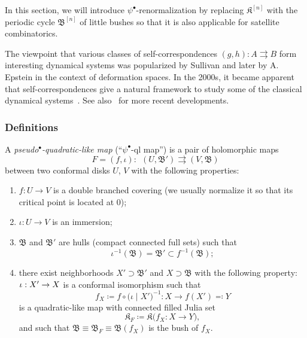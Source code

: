 \documentclass{amsart}
\newcommand{\bfilled}{{\boldsymbol{\mathfrak K} }}
\newcommand{\filled}{{\mathfrak K }}
\newcommand{\bush}{{\mathfrak B }}
\newcommand{\bbush}{{\boldsymbol {\mathfrak B} }}
\renewcommand{\sp}{{\ \ }}
\newcommand{\1}{{\mathbb 1 }}
\begin{document}
In this section, we will introduce $\psi^\bullet$-renormalization by replacing $\bfilled^{[n]}$ with the periodic cycle $\bbush^{[n]}$ of little bushes so that it is also applicable for satellite combinatorics. 

\begin{rem}
The viewpoint that various classes of self-correspondences ${(g,h)\colon A \rightrightarrows B}$ form interesting dynamical systems was popularized by Sullivan and later by A. Epstein in the context of deformation spaces. In the 2000s, it became apparent that self-correspondences give a natural framework to study some of the classical dynamical systems~\cite{IS,K, N}. See also~\cite{BD, T} for more recent developments.
\end{rem}




\subsubsection{Definitions}
\label{sss:qlb:Defn}
A {\em  pseudo${}^\bullet$-quadratic-like map} (``$\psi^\bullet$-ql map'') 
is a pair of holomorphic  maps 
\begin{equation}
\label{eq:dfn:psib-ql}
F=(f,\iota)\colon \sp ( U, \bush')  \rightrightarrows (V, \bush )
\end{equation} between two conformal  disks $U$, $V$
with the following properties:


\begin{enumerate}[label=\text{(\Roman*)},font=\normalfont,leftmargin=*]
\item\label{dfn:psib-ql:1}  $f\colon U\to V$ is a double branched covering
    (we usually normalize it so that its critical point is located at $0$);

\item \label{dfn:psib-ql:2} $\iota\colon U\to V$ is an immersion;

\item \label{dfn:psib-ql:3}
 $\bush$ and $\bush'$  are hulls (compact connected full sets) such that \[\iota^{-1} (\bush)=\bush'  \subset f^{-1} (\bush) ;\]

\item \label{dfn:psib-ql:4}
 there exist neighborhoods $X'\supset \bush'$ and $X \supset \bush$ with the following property: $\iota: X' \rightarrow X$ is a conformal isomorphism such that
\begin{equation}\label{eq:dfn:ql b domain}
f_X\coloneqq f\circ \big(\iota\mid X'\big)^{-1} : X \to f(X')\eqqcolon Y 
\end{equation} 
 is a quadratic-like map with connected filled Julia set
\begin{equation}
\label{eq:dfn:non-esc b} \filled_F\coloneqq \filled\big(f_X : X\to Y\big),
\end{equation}
 and such that $\bush\equiv\bush_F\equiv \bush(f_X)$ is the bush of $f_X$.
 \end{enumerate}
 
\end{document}
